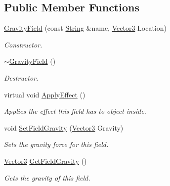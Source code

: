 \subsection*{Public Member Functions}
\begin{DoxyCompactItemize}
\item 
\hyperlink{classphys_1_1GravityField_a9093176e954b4c631d0757a553971cfd}{GravityField} (const \hyperlink{namespacephys_aa03900411993de7fbfec4789bc1d392e}{String} \&name, \hyperlink{classphys_1_1Vector3}{Vector3} Location)
\begin{DoxyCompactList}\small\item\em Constructor. \item\end{DoxyCompactList}\item 
\hyperlink{classphys_1_1GravityField_ae41a656b247a2982da2e1ae666c605d0}{$\sim$GravityField} ()
\begin{DoxyCompactList}\small\item\em Destructor. \item\end{DoxyCompactList}\item 
virtual void \hyperlink{classphys_1_1GravityField_a0322cb1635bbcb951493d9e17cc9acb1}{ApplyEffect} ()
\begin{DoxyCompactList}\small\item\em Applies the effect this field has to object inside. \item\end{DoxyCompactList}\item 
void \hyperlink{classphys_1_1GravityField_a7cebfe216580e9ef607a2ea070cbeaec}{SetFieldGravity} (\hyperlink{classphys_1_1Vector3}{Vector3} Gravity)
\begin{DoxyCompactList}\small\item\em Sets the gravity force for this field. \item\end{DoxyCompactList}\item 
\hyperlink{classphys_1_1Vector3}{Vector3} \hyperlink{classphys_1_1GravityField_ae776978b7e8fa1d656bdb216aa6f2d20}{GetFieldGravity} ()
\begin{DoxyCompactList}\small\item\em Gets the gravity of this field. \item\end{DoxyCompactList}\end{DoxyCompactItemize}
